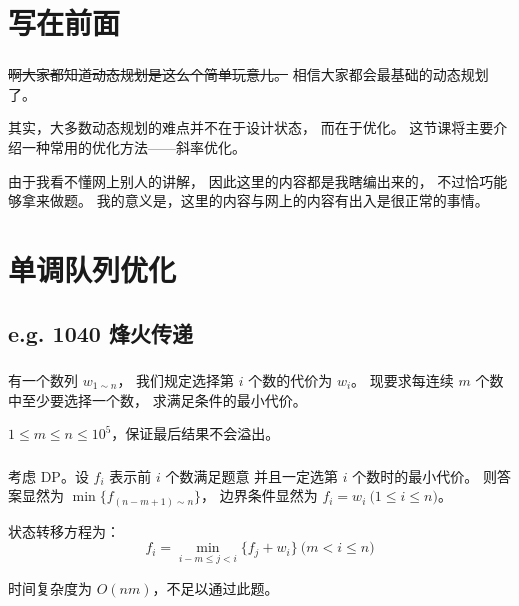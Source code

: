 \documentclass[9pt, UTF8]{beamer} %
\title{\insertsubject}
\author{Orange}
\institute{CQ No.11 High}
\date{\today}
\newcommand \ft {\frametitle{\insertsection}}
\newcommand \fts {\frametitle{\insertsubsection}}
\newcommand \bpause { \bigskip \pause }
\begin{document}
	\setlength{\parindent}{2em} %

	\begin{frame}
		\titlepage
	\end{frame}

	\section{写在前面}

	\begin{frame}
		\ft

		\sout{啊大家都知道动态规划是这么个简单玩意儿。}
		相信大家都会最基础的动态规划了。

		其实，大多数动态规划的难点并不在于设计状态，
		而在于优化。
		这节课将主要介绍一种常用的优化方法——斜率优化。

		\bpause

		由于我看不懂网上别人的讲解，
		因此这里的内容都是我瞎编出来的，
		不过恰巧能够拿来做题。
		我的意义是，这里的内容与网上的内容有出入是很正常的事情。
	\end{frame}

	\section{单调队列优化}

	\subsection{e.g. 1040 烽火传递}

	\begin{frame}
		\fts

		有一个数列 $w_{1 \sim n}$，
		我们规定选择第 $i$ 个数的代价为 $w_i$。
		现要求每连续 $m$ 个数中至少要选择一个数，
		求满足条件的最小代价。

		\bigskip

		$1 \le m \le n \le 10^5$，保证最后结果不会溢出。
	\end{frame}

	\begin{frame}
		\fts

		考虑 DP。设 $f_i$ 表示前 $i$ 个数满足题意
		并且一定选第 $i$ 个数时的最小代价。
		则答案显然为 $\min \{ f_{(n - m + 1) \sim n} \}$，
		边界条件显然为 $f_i = w_i \pod {1 \le i \le n}$。

		\bpause

		状态转移方程为：
		$$
		f_i = \min_{i - m \le j < i} \{ f_j + w_i \} \pod {m < i \le n}
		$$

		时间复杂度为 $O(nm)$，不足以通过此题。
	\end{frame}
\end{document}
